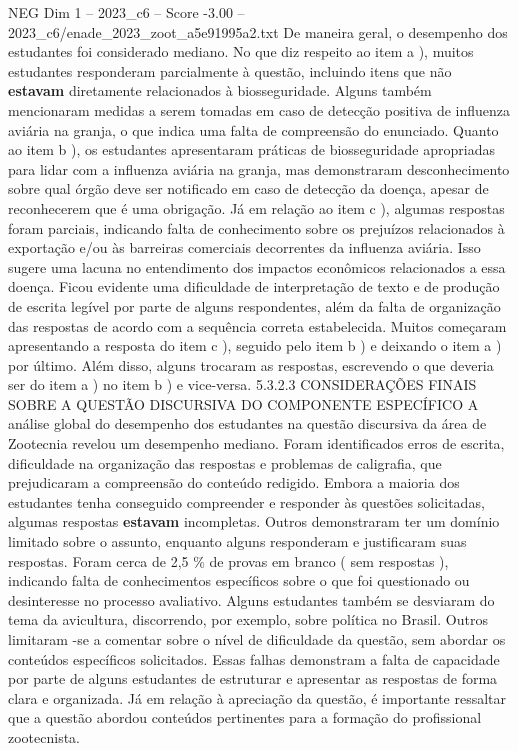 \begin{textsample}{NEG Dim 1 – 2023\_c6 – Score -3.00 – 2023\_c6/enade\_2023\_zoot\_a5e91995a2.txt}
De maneira geral, o desempenho dos estudantes foi considerado mediano.
No que diz respeito ao item a ), muitos estudantes responderam parcialmente à questão, incluindo itens que não \textbf{estavam} diretamente relacionados à biosseguridade.
Alguns também mencionaram medidas a serem tomadas em caso de detecção positiva de influenza aviária na granja, o que indica uma falta de compreensão do enunciado.
Quanto ao item b ), os estudantes apresentaram práticas de biosseguridade apropriadas para lidar com a influenza aviária na granja, mas demonstraram desconhecimento sobre qual órgão deve ser notificado em caso de detecção da doença, apesar de reconhecerem que é uma obrigação.
Já em relação ao item c ), algumas respostas foram parciais, indicando falta de conhecimento sobre os prejuízos relacionados à exportação e/ou às barreiras comerciais decorrentes da influenza aviária.
Isso sugere uma lacuna no entendimento dos impactos econômicos relacionados a essa doença.
Ficou evidente uma dificuldade de interpretação de texto e de produção de escrita legível por parte de alguns respondentes, além da falta de organização das respostas de acordo com a sequência correta estabelecida.
Muitos começaram apresentando a resposta do item c ), seguido pelo item b ) e deixando o item a ) por último.
Além disso, alguns trocaram as respostas, escrevendo o que deveria ser do item a ) no item b ) e vice-versa. 5.3.2.3 CONSIDERAÇÕES FINAIS SOBRE A QUESTÃO DISCURSIVA DO COMPONENTE ESPECÍFICO A análise global do desempenho dos estudantes na questão discursiva da área de Zootecnia revelou um desempenho mediano.
Foram identificados erros de escrita, dificuldade na organização das respostas e problemas de caligrafia, que prejudicaram a compreensão do conteúdo redigido.
Embora a maioria dos estudantes tenha conseguido compreender e responder às questões solicitadas, algumas respostas \textbf{estavam} incompletas.
Outros demonstraram ter um domínio limitado sobre o assunto, enquanto alguns responderam e justificaram suas respostas.
Foram cerca de 2,5 \% de provas em branco ( sem respostas ), indicando falta de conhecimentos específicos sobre o que foi questionado ou desinteresse no processo avaliativo.
Alguns estudantes também se desviaram do tema da avicultura, discorrendo, por exemplo, sobre política no Brasil.
Outros limitaram -se a comentar sobre o nível de dificuldade da questão, sem abordar os conteúdos específicos solicitados.
Essas falhas demonstram a falta de capacidade por parte de alguns estudantes de estruturar e apresentar as respostas de forma clara e organizada.
Já em relação à apreciação da questão, é importante ressaltar que a questão abordou conteúdos pertinentes para a formação do profissional zootecnista.

\end{textsample}
